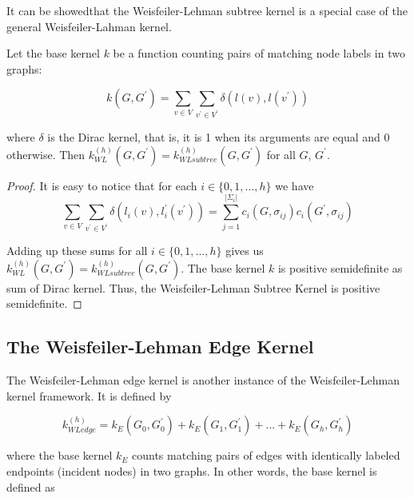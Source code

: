 \documentclass{llncs}
\begin{document}
It can be showedthat the Weisfeiler-Lehman subtree kernel is a special case of the general Weisfeiler-Lahman kernel.

\begin{theorem}
Let the base kernel $k$ be a function counting pairs of matching node labels in two graphs: 

\begin{equation}
k(G, G^{\prime}) = \sum_{v \in V} \sum_{v^{\prime} \in V^{\prime}} \delta(l(v), l(v^{\prime}))
\end{equation}

where $\delta$ is the Dirac kernel, that is, it is 1 when its arguments are equal and 0 otherwise. Then $k_{WL}^{(h)}(G, G^{\prime}) = k_{WLsubtree}^{(h)} (G, G^{\prime})$ for all $G$, $G^{\prime}$.

\end{theorem}

\begin{proof}
It is easy to notice that for each $i \in \{0, 1, ..., h\}$ we have  
\begin{equation}
\sum_{v \in V} \sum_{v^{\prime} \in V^{\prime}} \delta(l_i(v), l_i^{\prime}(v^{\prime})) = \sum_{j=1}^{|\Sigma_i|} c_i(G, \sigma_{ij}) c_i(G^{\prime}, \sigma_{ij})
\end{equation}

Adding up these sums for all $i \in \{0, 1, ..., h\}$ gives us $k_{WL}^{(h)}(G, G^{\prime}) = k_{WLsubtree}^{(h)}(G, G^{\prime})$. The base kernel $k$ is positive semidefinite as sum of Dirac kernel. Thus, the Weisfeiler-Lehman Subtree Kernel is positive semidefinite. 

\end{proof}


%
\subsection{The Weisfeiler-Lehman Edge Kernel}
%

The Weisfeiler-Lehman edge kernel is another instance of the Weisfeiler-Lehman kernel framework. It is defined by  

\begin{equation}
k_{WLedge}^{(h)} = k_E(G_0, G_0^{\prime}) + k_E(G_1, G_1^{\prime}) + ... + k_E(G_h, G_h^{\prime})
\end{equation}

where the base kernel $k_E$ counts matching pairs of edges with identically labeled endpoints (incident nodes) in two graphs. In other words, the base kernel is defined as
\end{document}
